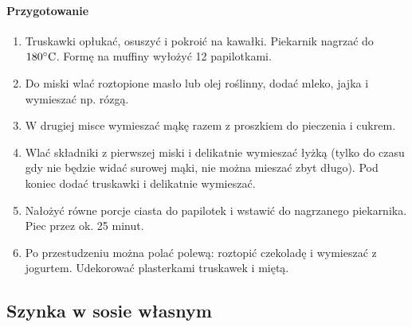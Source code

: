 \documentclass{article}
\begin{document}
    \paragraph{Przygotowanie}
    \begin{enumerate}
        \item Truskawki opłukać, osuszyć i pokroić na kawałki. Piekarnik nagrzać
            do $180\celsius$. Formę na muffiny wyłożyć 12 papilotkami.
        \item Do miski wlać roztopione masło lub olej roślinny, dodać mleko,
            jajka i wymieszać np. rózgą.
        \item W drugiej misce wymieszać mąkę razem z proszkiem do pieczenia i
            cukrem.
        \item Wlać składniki z pierwszej miski i delikatnie wymieszać łyżką
            (tylko do czasu gdy nie będzie widać surowej mąki, nie można mieszać
            zbyt długo).  Pod koniec dodać truskawki i delikatnie wymieszać.
        \item Nałożyć równe porcje ciasta do papilotek i wstawić do nagrzanego
            piekarnika. Piec przez ok. 25 minut.
        \item Po przestudzeniu można polać polewą: roztopić czekoladę i
            wymieszać z jogurtem. Udekorować plasterkami truskawek i miętą.
    \end{enumerate}
    \newpage


    \subsection{Szynka w sosie własnym}
    \bigskip
\end{document}
